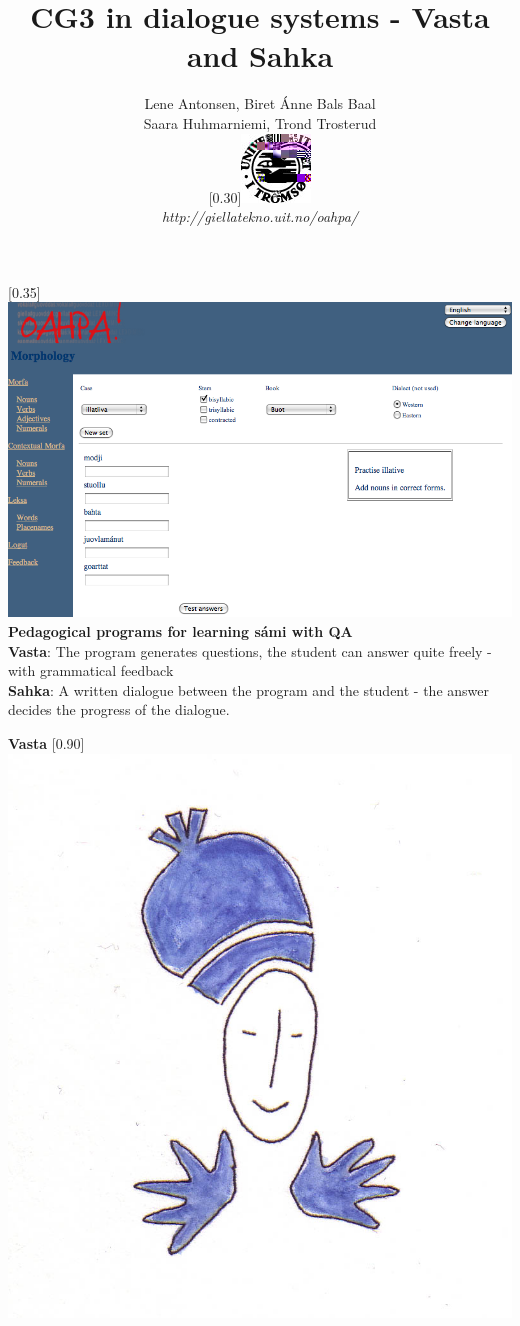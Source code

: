 \documentclass[landscape,norsk,11pt]{seminar}
\title{CG3 in dialogue systems - Vasta and Sahka}
\author{Lene Antonsen, Biret Ánne Bals Baal\\
Saara Huhmarniemi, Trond Trosterud \\
 \scalebox{0.30}[0.30]{\includegraphics{img/logoWeb070sh.jpg}} \\
  \textit{http://giellatekno.uit.no/oahpa/}}
\begin{document}
\begin{slide}

\maketitle

\newslide
\scalebox{0.35}[0.35]{\includegraphics{img/oahpa.png}} \\


\newslide
\textbf{Pedagogical programs for learning sámi with QA}\\
\newline
\textbf{Vasta}: The program generates questions, the student can answer quite freely - with grammatical feedback \\ \newline
\textbf{Sahka}: A written dialogue between the program and the student - the answer decides the progress of the dialogue.




\newslide
\textbf{Vasta}
\scalebox{0.90}[0.90]{\includegraphics{img/vasta.png}} \\


\end{slide}
\end{document}
